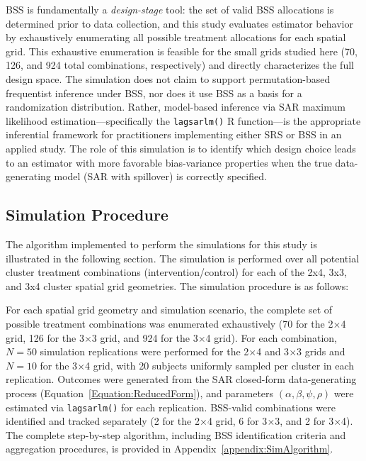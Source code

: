 \documentclass{article}[11pt]
\begin{document}
BSS is fundamentally a \emph{design-stage} tool: the set of valid BSS allocations is determined prior to data collection, and this study evaluates estimator behavior by exhaustively enumerating all possible treatment allocations for each spatial grid. This exhaustive enumeration is feasible for the small grids studied here (70, 126, and 924 total combinations, respectively) and directly characterizes the full design space. The simulation does not claim to support permutation-based frequentist inference under BSS, nor does it use BSS as a basis for a randomization distribution. Rather, model-based inference via SAR maximum likelihood estimation---specifically the \texttt{lagsarlm()} R function---is the appropriate inferential framework for practitioners implementing either SRS or BSS in an applied study. The role of this simulation is to identify which design choice leads to an estimator with more favorable bias-variance properties when the true data-generating model (SAR with spillover) is correctly specified.

\subsection{Simulation Procedure}

The algorithm implemented to perform the simulations for this study is illustrated in the following section. The simulation is performed over all potential cluster treatment combinations (intervention/control) for each of the 2x4, 3x3, and 3x4 cluster spatial grid geometries. The simulation procedure is as follows:

For each spatial grid geometry and simulation scenario, the complete set of possible treatment combinations was enumerated exhaustively (70 for the 2$\times$4 grid, 126 for the 3$\times$3 grid, and 924 for the 3$\times$4 grid). For each combination, $N = 50$ simulation replications were performed for the 2$\times$4 and 3$\times$3 grids and $N = 10$ for the 3$\times$4 grid, with 20 subjects uniformly sampled per cluster in each replication. Outcomes were generated from the SAR closed-form data-generating process (Equation~\ref{Equation:ReducedForm}), and parameters $(\alpha, \beta, \psi, \rho)$ were estimated via \texttt{lagsarlm()} for each replication. BSS-valid combinations were identified and tracked separately (2 for the 2$\times$4 grid, 6 for 3$\times$3, and 2 for 3$\times$4). The complete step-by-step algorithm, including BSS identification criteria and aggregation procedures, is provided in Appendix~\ref{appendix:SimAlgorithm}.
\end{document}
